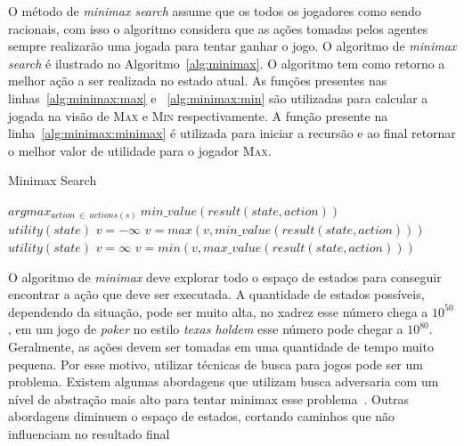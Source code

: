 O método de \textit{minimax search} assume que os todos os jogadores como sendo racionais, com isso o algoritmo considera que as ações tomadas pelos agentes sempre realizarão uma jogada para tentar ganhar o jogo.
O algoritmo de \textit{minimax search} é ilustrado no Algoritmo~\ref{alg:minimax}. 
O algoritmo tem como retorno a melhor ação a ser realizada no estado atual. 
As funções presentes nas linhas~\ref{alg:minimax:max} e ~\ref{alg:minimax:min} são utilizadas para calcular a jogada na visão de \textsc{Max} e \textsc{Min} respectivamente.
A função presente na linha~\ref{alg:minimax:minimax} é utilizada para iniciar a recursão e ao final retornar o melhor valor de utilidade para o jogador \textsc{Max}.

\begin{algorithm}
	\caption{Minimax Search}
	\label{alg:minimax}
	\begin{algorithmic}[1]	
		 \label{alg:minimax:minimax}
		\State \Return $arg max_{action~ \in~ actions(s)}~ min\_value(result(state,  action)) $
		\EndFunction \\
		\label{alg:minimax:max}
		\State	\Return $utility(state)$
		\EndIf
		\State $v = -\infty$
		\State $v = max(v, min\_value(result(state,action)))$
		\EndFor	
		\EndFunction \\
		\label{alg:minimax:min}
		\State	\Return $utility(state)$
		\EndIf
		\State $v = \infty$
		\State $v = min(v, max\_value(result(state,action)))$
		\EndFor	
		\EndFunction
	\end{algorithmic}
\end{algorithm}


O algoritmo de \textit{minimax} deve explorar todo o espaço de estados para conseguir encontrar a ação que deve ser executada. 
A quantidade de estados possíveis, dependendo da situação, pode ser muito alta, no xadrez esse número chega a $10^{50}$, em um jogo de \textit{poker} no estilo \textit{texas holdem} esse número pode chegar a $10^{80}$. 
Geralmente, as ações devem ser tomadas em uma quantidade de tempo muito pequena. 
Por esse motivo, utilizar técnicas de busca para jogos pode ser um problema. 
Existem algumas abordagens que utilizam busca adversaria com um nível de abstração mais alto para tentar minimax esse problema~\cite{ontanon2013survey}. Outras abordagens diminuem o espaço de estados, cortando caminhos que não influenciam no resultado final~\cite[Capítulo 5]{intelligence2003modern}